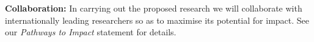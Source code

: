 \documentclass[a4paper,11pt]{article}
\begin{document}
\vspace*{0.02in}

{\bf Collaboration:} In carrying out the proposed research we will
collaborate with internationally leading researchers so as to maximise
its potential for impact. See our {\em Pathways to
  Impact} statement for details.


\vspace{-0.15in}
\end{document}
